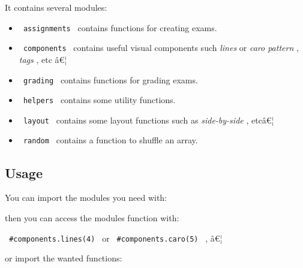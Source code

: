 It contains several modules:

\begin{itemize}
\tightlist
\item
  \texttt{\ assignments\ } contains functions for creating exams.
\item
  \texttt{\ components\ } contains useful visual components such
  \emph{lines} or \emph{caro pattern} , \emph{tags} , etc â€¦
\item
  \texttt{\ grading\ } contains functions for grading exams.
\item
  \texttt{\ helpers\ } contains some utility functions.
\item
  \texttt{\ layout\ } contains some layout functions such as
  \emph{side-by-side} , etcâ€¦
\item
  \texttt{\ random\ } contains a function to shuffle an array.
\end{itemize}

\subsection{Usage}\label{usage}

You can import the modules you need with:

\begin{Shaded}
\begin{Highlighting}[]
\end{Highlighting}
\end{Shaded}

then you can access the modules function with:

\texttt{\ \#components.lines(4)\ } or \texttt{\ \#components.caro(5)\ }
, â€¦

or import the wanted functions:

\begin{Shaded}
\begin{Highlighting}[]



\NormalTok{\#assignment[First assignment}

\NormalTok{    \#question[}
\NormalTok{    ]}
\NormalTok{]}
\end{Highlighting}
\end{Shaded}

